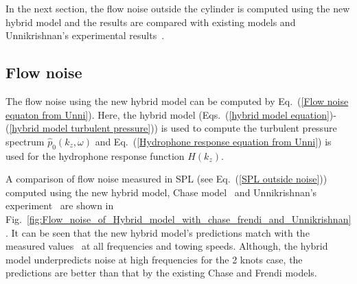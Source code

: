 \documentclass[twocolumn,10pt]{asme2ej}
\begin{document}
In the next section, the flow noise outside the cylinder is computed using the new hybrid model and the results are compared with existing models and Unnikrishnan's experimental results~\cite{Unni2011}.

\subsection{Flow noise}
The flow noise using the new hybrid model can be computed by Eq.~(\ref{Flow noise equaton from Unni}). Here, the hybrid model (Eqs.~(\ref{hybrid model equation})-(\ref{hybrid model turbulent pressure})) is used to compute the turbulent pressure spectrum $\hat{p}_0(k_z,\omega)$ and Eq.~(\ref{Hydrophone response equation from Unni}) is used for the hydrophone response function $H(k_z)$.


A comparison of flow noise measured in SPL (see Eq.~(\ref{SPL outside noise})) computed using the new hybrid model, Chase model~\cite{Chase1981} and Unnikrishnan's experiment~\cite{Unni2011} are shown in Fig.~\ref{fig:Flow_noise_of_Hybrid_model_with_chase_frendi_and_Unnikrishnan}. It can be seen that the new hybrid model's predictions match with the measured values~\cite{Unni2011} at all frequencies and towing speeds. Although, the hybrid model underpredicts noise at high frequencies for the 2 knots case, the predictions are better than that by the existing Chase and Frendi models.
\end{document}
